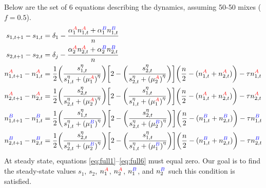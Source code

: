 \documentclass[10pt]{article}
\theoremstyle{remark}
\newcommand{\A}{{\color{red}A}}
\newcommand{\B}{{\color{blue}B}}
\begin{document}
Below are the set of 6 equations describing the dynamics, assuming 50-50 mixes ($f=0.5$).
\begin{align}
    s_{1,t+1} - s_{1,t} & = \delta_1 - \frac{\alpha_1^{\A} n_{1,t}^{\A} + \alpha_1^{\B} n_{1,t}^{\B} }{n} \label{eq:full1}\\
    s_{2,t+1} - s_{2,t} & = \delta_j - \frac{\alpha_2^{\A} n_{2,t}^{\A} + \alpha_2^{\B} n_{2,t}^{\B} }{n} \label{eq:full2}\\
    n_{1,t+1}^{\A} - n_{1,t}^{\A} 
    & = \frac{1}{2} 
    \bigg( \frac{s_{1,t}^\eta}{s_{1,t}^\eta + {(\mu_1^{\A})}^\eta} \bigg)
    \bigg[ 2 - \bigg( \frac{s_{2,t}^\eta}{s_{2,t}^\eta + {(\mu_2^{\A})}^\eta} \bigg) \bigg] \bigg(\frac{n}{2}
    - (n_{1,t}^{\A} + n_{2,t}^{\A}) \bigg) - \tau n_{1,t}^{\A}
    \label{eq:full3}\\
    n_{2,t+1}^{\A} - n_{2,t}^{\A} 
    & = \frac{1}{2} 
    \bigg( \frac{s_{2,t}^\eta}{s_{2,t}^\eta + {(\mu_2^{\A})}^\eta} \bigg) 
    \bigg[ 2 - \bigg( \frac{s_{1,t}^\eta}{s_{1,t}^\eta + {(\mu_1^{\A})}^\eta} \bigg) \bigg] 
    \bigg(\frac{n}{2} - (n_{1,t}^{\A} + n_{2,t}^{\A}) \bigg) - \tau n_{2,t}^{\A}
    \label{eq:full4}\\
    n_{1,t+1}^{\B} - n_{1,t}^{\B} 
    & = \frac{1}{2} 
    \bigg( \frac{s_{1,t}^\eta}{s_{1,t}^\eta + {(\mu_1^{\B})}^\eta} \bigg)
    \bigg[ 2 - \bigg( \frac{s_{2,t}^\eta}{s_{2,t}^\eta + {(\mu_2^{\B})}^\eta} \bigg) \bigg]
    \bigg(\frac{n}{2} - (n_{1,t}^{\B} + n_{2,t}^{\B}) \bigg) - \tau n_{1,t}^{\B}
    \label{eq:full5}\\
    n_{2,t+1}^{\B} - n_{2,t}^{\B} 
    & = \frac{1}{2} 
    \bigg( \frac{s_{2,t}^\eta}{s_{2,t}^\eta + {(\mu_2^{\B})}^\eta} \bigg) 
    \bigg[ 2 - \bigg( \frac{s_{1,t}^\eta}{s_{1,t}^\eta + {(\mu_1^{\B})}^\eta} \bigg) \bigg]
    \bigg(\frac{n}{2} - (n_{1,t}^{\B} + n_{2,t}^{\B}) \bigg) - \tau n_{2,t}^{\B}
    \label{eq:full6}
\end{align}
At steady state, equations \eqref{eq:full1}--\eqref{eq:full6} must equal zero. Our goal is to find the steady-state values $s_{1}$, $s_{2}$, $n_{1}^{\A}$, $n_{2}^{\A}$, $n_{1}^{\B}$, and $n_{2}^{\B}$ such this condition is satisfied. 
\end{document}
